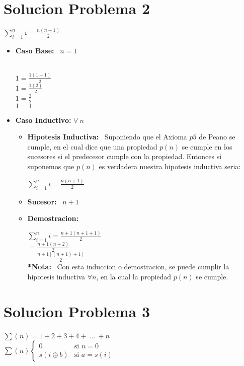 \documentclass[10pt,a4paper]{article}
\begin{document}
\section*{Solucion Problema 2}
\begin{center}
$ \sum_{i=1}^{n}{i}=\frac{n(n+1)}{2} $
\end{center}
\begin{itemize}
\item \textbf{Caso Base: } \ $ n = 1 $ 
\begin{center}
\
\\ $ 1 = \frac{1(1+1)}{2} $
\
\\ $ 1 = \frac{1(2)}{2}$
\
\\ $ 1 = \frac{2}{2}$
\
\\ $ 1 = 1 $
\end{center}
\item \textbf{Caso Inductivo: } $ \forall \ n$
\begin{itemize}
\item \textbf{Hipotesis Inductiva: } \ Suponiendo que el Axioma $ p5 $ de Peano se cumple, en el cual dice que una propiedad $ p(n) $ se cumple en los sucesores si el predecesor cumple con la propiedad. Entonces si suponemos que $ p(n) $ es verdadera nuestra hipotesis inductiva seria: 
\begin{center}
$ \sum_{i=1}^{n}{i}=\frac{n(n+1)}{2} $
\end{center}
\item \textbf{Sucesor: } \ $ n+1 $
\item \textbf{Demostracion: }
\begin{center}
$ \sum_{i=1}^{n}{i}= \frac{n+1(n+1+1)}{2} $
\
\\$					= \frac{n+1(n+2)}{2} $
\
\\$					= \frac{n+1 [(n+1)+1]}{2} $
\
\\\textbf{*Nota:} \ Con esta induccion o demostracion, se puede cumplir la hipotesis inductiva $ \forall n $, en la cual la propiedad $ p(n) $ se cumple. 
\end{center}
\end{itemize}
\end{itemize}

\section*{Solucion Problema 3}
\begin{center}
$ \sum(n)=1+2+3+4+\ \ldots\ +n $
\
\\ $ \sum(n)   \left\{
                        \begin{array}{ll}
                                0  & \mbox{si } n = 0 \\
                                s(i\oplus b) & \mbox{si } a = s(i)
                        \end{array}
                \right.
$
\end{center}
\end{document}
